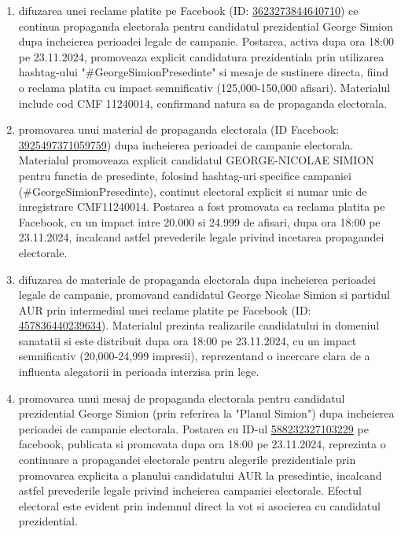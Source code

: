 \documentclass[a4paper,12pt]{article}
\begin{document}
\begin{enumerate}[leftmargin=*, label=\arabic*.)]
    \item difuzarea unei reclame platite pe Facebook (ID: \href{https://www.facebook.com/ads/library/?id=3623273844640710}{3623273844640710}) ce continua propaganda electorala pentru candidatul prezidential George Simion dupa incheierea perioadei legale de campanie. Postarea, activa dupa ora 18:00 pe 23.11.2024, promoveaza explicit candidatura prezidentiala prin utilizarea hashtag-ului "\#GeorgeSimionPresedinte" si mesaje de sustinere directa, fiind o reclama platita cu impact semnificativ (125,000-150,000 afisari). Materialul include cod CMF 11240014, confirmand natura sa de propaganda electorala.
    \item promovarea unui material de propaganda electorala (ID Facebook: \href{https://www.facebook.com/ads/library/?id=3925497371059759}{3925497371059759}) dupa incheierea perioadei de campanie electorala. Materialul promoveaza explicit candidatul GEORGE-NICOLAE SIMION pentru functia de presedinte, folosind hashtag-uri specifice campaniei (\#GeorgeSimionPresedinte), continut electoral explicit si numar unic de inregistrare CMF11240014. Postarea a fost promovata ca reclama platita pe Facebook, cu un impact intre 20.000 si 24.999 de afisari, dupa ora 18:00 pe 23.11.2024, incalcand astfel prevederile legale privind incetarea propagandei electorale.
    \item difuzarea de materiale de propaganda electorala dupa incheierea perioadei legale de campanie, promovand candidatul George Nicolae Simion si partidul AUR prin intermediul unei reclame platite pe Facebook (ID: \href{https://www.facebook.com/ads/library/?id=457836440239634}{457836440239634}). Materialul prezinta realizarile candidatului in domeniul sanatatii si este distribuit dupa ora 18:00 pe 23.11.2024, cu un impact semnificativ (20,000-24,999 impresii), reprezentand o incercare clara de a influenta alegatorii in perioada interzisa prin lege.
    \item promovarea unui mesaj de propaganda electorala pentru candidatul prezidential George Simion (prin referirea la "Planul Simion") dupa incheierea perioadei de campanie electorala. Postarea cu ID-ul \href{https://www.facebook.com/ads/library/?id=588232327103229}{588232327103229} pe facebook, publicata si promovata dupa ora 18:00 pe 23.11.2024, reprezinta o continuare a propagandei electorale pentru alegerile prezidentiale prin promovarea explicita a planului candidatului AUR la presedintie, incalcand astfel prevederile legale privind incheierea campaniei electorale. Efectul electoral este evident prin indemnul direct la vot si asocierea cu candidatul prezidential.

\end{enumerate}
\end{document}
